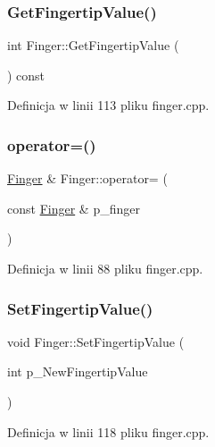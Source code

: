 \subsubsection{\texorpdfstring{Get\+Fingertip\+Value()}{GetFingertipValue()}}
{\footnotesize\ttfamily int Finger\+::\+Get\+Fingertip\+Value (\begin{DoxyParamCaption}{ }\end{DoxyParamCaption}) const}



Definicja w linii 113 pliku finger.\+cpp.

\mbox{\label{class_finger_a09ecbb5c21531a771b9524dfcd49b6a6}} 
\subsubsection{\texorpdfstring{operator=()}{operator=()}}
{\footnotesize\ttfamily \hyperlink{class_finger}{Finger} \& Finger\+::operator= (\begin{DoxyParamCaption}\item[{const \hyperlink{class_finger}{Finger} \&}]{p\+\_\+finger }\end{DoxyParamCaption})}



Definicja w linii 88 pliku finger.\+cpp.

\mbox{\label{class_finger_acb60693c51df450dc51796ec235894f9}} 
\subsubsection{\texorpdfstring{Set\+Fingertip\+Value()}{SetFingertipValue()}}
{\footnotesize\ttfamily void Finger\+::\+Set\+Fingertip\+Value (\begin{DoxyParamCaption}\item[{int}]{p\+\_\+\+New\+Fingertip\+Value }\end{DoxyParamCaption})}



Definicja w linii 118 pliku finger.\+cpp.

\mbox{\label{class_finger_a95a2e12235a97dec295aeb92c749ec06}} 
